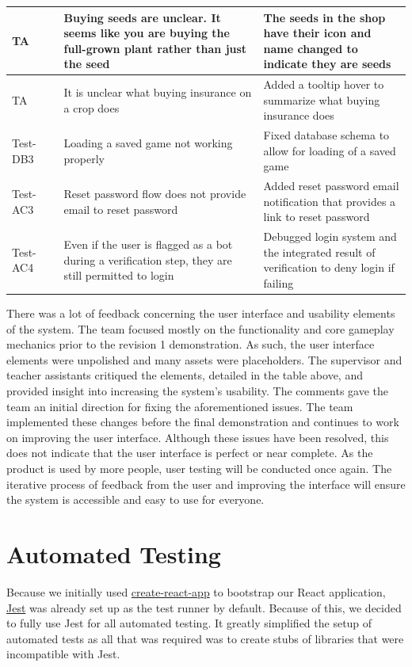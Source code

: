 \documentclass[12pt, titlepage]{article}
\begin{document}
\begin{table}[H]
{\begin{tabular}{|p{0.135\linewidth}|p{0.5\linewidth}|p{0.6\linewidth}|}
\hline
TA & Buying seeds are unclear. It seems like you are buying the full-grown plant rather than just the seed & The seeds in the shop have their icon and name changed to indicate they are seeds \\
\hline
TA & It is unclear what buying insurance on a crop does & Added a tooltip hover to summarize what buying insurance does \\
\hline
Test-DB3 & Loading a saved game not working properly & Fixed database schema to allow for loading of a saved game \\
\hline
Test-AC3 & Reset password flow does not provide email to reset password & Added reset password email notification that provides a link to reset password \\
\hline
Test-AC4 & Even if the user is flagged as a bot during a verification step, they are still permitted to login & Debugged login system and the integrated result of verification to deny login if failing \\
\hline
\end{tabular}}
\end{table}

\quad There was a lot of feedback concerning the user interface and usability elements of the system. The team focused mostly on the functionality and core gameplay mechanics prior to the revision 1 demonstration. As such, the user interface elements were unpolished and many assets were placeholders. The supervisor and teacher assistants critiqued the elements, detailed in the table above, and provided insight into increasing the system's usability. The comments gave the team an initial direction for fixing the aforementioned issues. The team implemented these changes before the final demonstration and continues to work on improving the user interface. Although these issues have been resolved, this does not indicate that the user interface is perfect or near complete. As the product is used by more people, user testing will be conducted once again. The iterative process of feedback from the user and improving the interface will ensure the system is accessible and easy to use for everyone.

\section{Automated Testing}

Because we initially used \href{https://reactjs.org/docs/create-a-new-react-app.html}{create-react-app} to bootstrap our React application, \href{https://jestjs.io/}{Jest} was already set up as the test runner by default. Because of this, we decided to fully use Jest for all automated testing. It greatly simplified the setup of automated tests as all that was required was to create stubs of libraries that were incompatible with Jest.
\\
\end{document}
